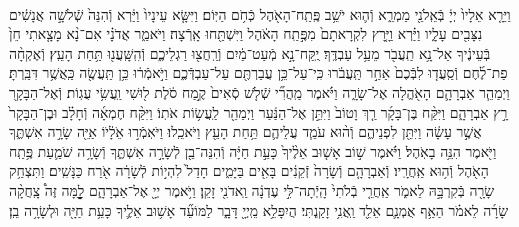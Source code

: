 \documentclass[twoside, openany, parskip=half, 11pt]{book}
\begin{document}
\begin{sometimes}
\begin{footnotesize}
\begin{multicols}{2}
\\
וַיֵּרָ֤א אֵלָיו֙ יְיָ֔ בְּֿאֵֽלֹנֵ֖י מַמְרֵ֑א וְֿה֛וּא יֹשֵׁ֥ב פֶּֽתַֽח־הָאֹ֖הֶל כְּֿחֹ֥ם הַיּֽוֹם׃ וַיִּשָּׂ֤א עֵינָיו֙ וַיַּ֔רְא וְֿהִנֵּה֙ שְֿׁלֹשָׁ֣ה אֲנָשִׁ֔ים נִצָּבִ֖ים עָלָ֑יו וַיַּ֗רְא וַיָּ֤רָץ לִקְרָאתָם֙ מִפֶּ֣תַֽח הָאֹ֔הֶל וַיִּשְׁתַּ֖חוּ אָֽרְֿצָה׃ וַיֹּאמַ֑ר אֲדֹנָ֗י אִם־נָ֨א מָצָ֤אתִי חֵן֙ בְּֿעֵינֶ֔יךָ אַל־נָ֥א תַֽעֲבֹ֖ר מֵעַ֥ל עַבְדֶּֽךָ׃
יֻֽקַּח־נָ֣א מְֿעַט־מַ֔יִם וְֿרַֽחֲצ֖וּ רַגְלֵיכֶ֑ם וְֿהִֽשָּֽׁעֲנ֖וּ תַּ֥חַת הָעֵֽץ׃ וְֿאֶקְחָ֨ה פַת־לֶ֜חֶם וְֿסַֽעֲד֤וּ לִבְּֿכֶם֙ אַחַ֣ר תַּֽעֲבֹ֔רוּ כִּֽי־עַל־כֵּ֥ן עֲבַרְתֶּ֖ם עַל־עַבְדְּֿכֶ֑ם וַיֹּ֣אמְֿר֔וּ כֵּ֥ן תַּֽעֲשֶׂ֖ה כַּֽאֲשֶׁ֥ר דִּבַּֽרְתָּ׃
וַיְמַהֵ֧ר אַבְרָהָ֛ם הָאֹ֖הֱלָה אֶל־שָׂרָ֑ה וַיֹּ֗אמֶר מַֽהֲרִ֞י שְֿׁלֹ֤שׁ סְֿאִים֙ קֶ֣מַח סֹ֔לֶת ל֖וּשִׁי וַֽעֲשִׂ֥י עֻגֽוֹת׃ וְֿאֶל־הַבָּקָ֖ר רָ֣ץ אַבְרָהָ֑ם וַיִּקַּ֨ח בֶּן־בָּקָ֜ר רַ֤ךְ וָטוֹב֙ וַיִּתֵּ֣ן אֶל־הַנַּ֔עַר וַיְמַהֵ֖ר לַֽעֲשׂ֥וֹת אֹתֽוֹ׃ וַיִּקַּ֨ח חֶמְאָ֜ה וְֿחָלָ֗ב וּבֶן־הַבָּקָר֙ אֲשֶׁ֣ר עָשָׂ֔ה וַיִּתֵּ֖ן לִפְנֵיהֶ֑ם וְֿה֨וּא עֹמֵ֧ד עֲלֵיהֶ֛ם תַּ֥חַת הָעֵ֖ץ וַיֹּאכֵֽלוּ׃  וַיֹּאֽמְֿר֣וּ אֵֹלָ֔יֹוֹ אַיֵּ֖ה שָׂרָ֣ה אִשְׁתֶּ֑ךָ וַיֹּ֖אמֶר הִנֵּ֥ה בָאֹֽהֶל׃ וַיֹּ֗אמֶר שׁ֣וֹב אָשׁ֤וּב אֵלֶ֨יךָ֙ כָּעֵ֣ת חַיָּ֔ה וְֿהִנֵּה־בֵ֖ן לְֿשָׂרָ֣ה אִשְׁתֶּ֑ךָ וְֿשָׂרָ֥ה שֹׁמַ֛עַת פֶּ֥תַֽח הָאֹ֖הֶל וְֿה֥וּא אַֽחֲרָֽיו׃ וְֿאַבְרָהָ֤ם וְֿשָׂרָה֙ זְֿקֵנִ֔ים בָּאִ֖ים בַּיָּמִ֑ים חָדַל֙ לִהְי֣וֹת לְֿשָׂרָ֔ה אֹ֖רַח כַּנָּשִֽׁים׃ וַתִּצְחַ֥ק שָׂרָ֖ה בְּֿקִרְבָּ֣הּ לֵאמֹ֑ר אַֽחֲרֵ֤י בְֿלֹתִי֙ הָֽיְֿתָה־לִּ֣י עֶדְנָ֔ה וַֽאדֹנִ֖י זָקֵֽן׃ וַיֹּ֥אמֶר יְיָ֖ אֶל־אַבְרָהָ֑ם לׇׇׇׇׇׇָ֣מָּה זֶּה֩ צָֽחֲקָ֨ה שָׂרָ֜ה לֵאמֹ֗ר הַאַ֥ף אֻמְנָ֛ם אֵלֵ֖ד וַֽאֲנִ֥י זָקַֽנְתִּי׃ הֲיִפָּלֵ֥א מֵֽיְיָ֖ דָּבָ֑ר לַמּוֹעֵ֞ד אָשׁ֥וּב אֵלֶ֛יךָ כָּעֵ֥ת חַיָּ֖ה וּלְשָׂרָ֥ה בֵֽן׃


\end{multicols}
\end{footnotesize}
\end{sometimes}
\end{document}
